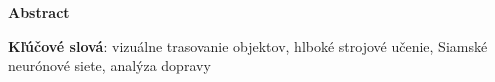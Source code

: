 \thispagestyle{plain}

\begin{center}
    \Large{\textbf{Abstract}}
\end{center}

\noindent \textbf{Kľúčové slová}: vizuálne trasovanie objektov, hlboké strojové učenie, Siamské neurónové siete, analýza dopravy
